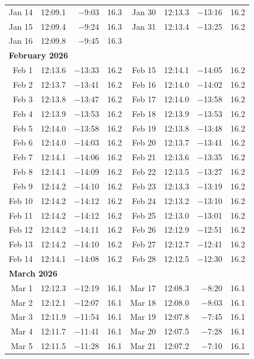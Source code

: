 {\begin{longtable}{r r r r | r r r r}
Jan 14 & 12:09.1 & $-$9:03 & 16.3 & Jan 30 & 12:13.3 & $-$13:16 & 16.2 \\
Jan 15 & 12:09.4 & $-$9:24 & 16.3 & Jan 31 & 12:13.4 & $-$13:25 & 16.2 \\
Jan 16 & 12:09.8 & $-$9:45 & 16.3 &  & & &  \\
\multicolumn{8}{l}{\textbf{February 2026}}\\
Feb 1 & 12:13.6 & $-$13:33 & 16.2 & Feb 15 & 12:14.1 & $-$14:05 & 16.2 \\
Feb 2 & 12:13.7 & $-$13:41 & 16.2 & Feb 16 & 12:14.0 & $-$14:02 & 16.2 \\
Feb 3 & 12:13.8 & $-$13:47 & 16.2 & Feb 17 & 12:14.0 & $-$13:58 & 16.2 \\
Feb 4 & 12:13.9 & $-$13:53 & 16.2 & Feb 18 & 12:13.9 & $-$13:53 & 16.2 \\
Feb 5 & 12:14.0 & $-$13:58 & 16.2 & Feb 19 & 12:13.8 & $-$13:48 & 16.2 \\
Feb 6 & 12:14.0 & $-$14:03 & 16.2 & Feb 20 & 12:13.7 & $-$13:41 & 16.2 \\
Feb 7 & 12:14.1 & $-$14:06 & 16.2 & Feb 21 & 12:13.6 & $-$13:35 & 16.2 \\
Feb 8 & 12:14.1 & $-$14:09 & 16.2 & Feb 22 & 12:13.5 & $-$13:27 & 16.2 \\
Feb 9 & 12:14.2 & $-$14:10 & 16.2 & Feb 23 & 12:13.3 & $-$13:19 & 16.2 \\
Feb 10 & 12:14.2 & $-$14:12 & 16.2 & Feb 24 & 12:13.2 & $-$13:10 & 16.2 \\
Feb 11 & 12:14.2 & $-$14:12 & 16.2 & Feb 25 & 12:13.0 & $-$13:01 & 16.2 \\
Feb 12 & 12:14.2 & $-$14:11 & 16.2 & Feb 26 & 12:12.9 & $-$12:51 & 16.2 \\
Feb 13 & 12:14.2 & $-$14:10 & 16.2 & Feb 27 & 12:12.7 & $-$12:41 & 16.2 \\
Feb 14 & 12:14.1 & $-$14:08 & 16.2 & Feb 28 & 12:12.5 & $-$12:30 & 16.2 \\
\multicolumn{8}{l}{\textbf{March 2026}}\\
Mar 1 & 12:12.3 & $-$12:19 & 16.1 & Mar 17 & 12:08.3 & $-$8:20 & 16.1 \\
Mar 2 & 12:12.1 & $-$12:07 & 16.1 & Mar 18 & 12:08.0 & $-$8:03 & 16.1 \\
Mar 3 & 12:11.9 & $-$11:54 & 16.1 & Mar 19 & 12:07.8 & $-$7:45 & 16.1 \\
Mar 4 & 12:11.7 & $-$11:41 & 16.1 & Mar 20 & 12:07.5 & $-$7:28 & 16.1 \\
Mar 5 & 12:11.5 & $-$11:28 & 16.1 & Mar 21 & 12:07.2 & $-$7:10 & 16.1 \\

\end{longtable}}
